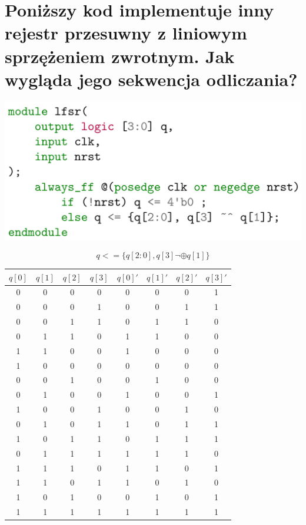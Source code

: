 \documentclass{article}
\begin{document}
\section{Poniższy kod implementuje inny rejestr przesuwny z liniowym sprzężeniem zwrotnym. Jak wygląda jego sekwencja odliczania?}
\begin{center}
\includegraphics[scale=0.2]{./L08Z02.png}
\end{center}
\begin{center}
	$$q <= \{q[2:0], q[3] \neg \oplus q[1]\}$$
	\begin{tabular}{|c|c|c|c||c|c|c|c|} 
	 \hline
	$q[0]$ & $q[1]$ & $q[2]$ & $q[3]$ & $q[0]'$ & $q[1]'$ & $q[2]'$ & $q[3]'$ \\ 
	 \hline \hline
	 0&0&0&0& 0&0&0&1\\ \hline
	 0&0&0&1& 0&0&1&1\\ \hline
	 0&0&1&1& 0&1&1&0\\ \hline
	 0&1&1&0& 1&1&0&0\\ \hline
	 1&1&0&0& 1&0&0&0\\ \hline	 
	 1&0&0&0& 0&0&0&0\\ \hline \hline
	 
	 0&0&1&0& 0&1&0&0\\ \hline
	 0&1&0&0& 1&0&0&1\\ \hline
	 1&0&0&1& 0&0&1&0\\ \hline\hline
	 
	 0&1&0&1& 1&0&1&1\\ \hline
	 1&0&1&1& 0&1&1&1\\ \hline
	 0&1&1&1& 1&1&1&0\\ \hline
	 1&1&1&0& 1&1&0&1\\ \hline
	 1&1&0&1& 1&0&1&0\\ \hline
	 1&0&1&0& 0&1&0&1\\ \hline \hline
	 
	 1&1&1&1& 1&1&1&1\\ \hline \hline
	\end{tabular} 
\end{center}
\end{document}
